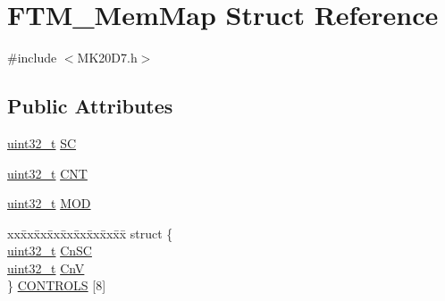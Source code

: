 \hypertarget{struct_f_t_m___mem_map}{}\section{F\+T\+M\+\_\+\+Mem\+Map Struct Reference}
\label{struct_f_t_m___mem_map}


{\ttfamily \#include $<$M\+K20\+D7.\+h$>$}

\subsection*{Public Attributes}
\begin{DoxyCompactItemize}
\item 
\hyperlink{_p_e___types_8h_a33594304e786b158f3fb30289278f5af}{uint32\+\_\+t} \hyperlink{struct_f_t_m___mem_map_a4b1c487fee64f94a40d5f170865fe466}{SC}
\item 
\hyperlink{_p_e___types_8h_a33594304e786b158f3fb30289278f5af}{uint32\+\_\+t} \hyperlink{struct_f_t_m___mem_map_a21d54fe19908bc95f2fd0107a8af69c2}{C\+NT}
\item 
\hyperlink{_p_e___types_8h_a33594304e786b158f3fb30289278f5af}{uint32\+\_\+t} \hyperlink{struct_f_t_m___mem_map_a5ad801f060851969c07a2c3f3a108ade}{M\+OD}
\item 
\begin{tabbing}
xx\=xx\=xx\=xx\=xx\=xx\=xx\=xx\=xx\=\kill
struct \{\\
\>\hyperlink{_p_e___types_8h_a33594304e786b158f3fb30289278f5af}{uint32\_t} \hyperlink{struct_f_t_m___mem_map_a3223f003731ed14e54ee3d9e77ee334c}{CnSC}\\
\>\hyperlink{_p_e___types_8h_a33594304e786b158f3fb30289278f5af}{uint32\_t} \hyperlink{struct_f_t_m___mem_map_a45398334c1dab06457c71ec0d5f5a7aa}{CnV}\\
\} \hyperlink{struct_f_t_m___mem_map_a1225196b7d1869e62a82af6cec93638c}{CONTROLS} \mbox{[}8\mbox{]}\\


\end{tabbing}
\end{DoxyCompactItemize}
